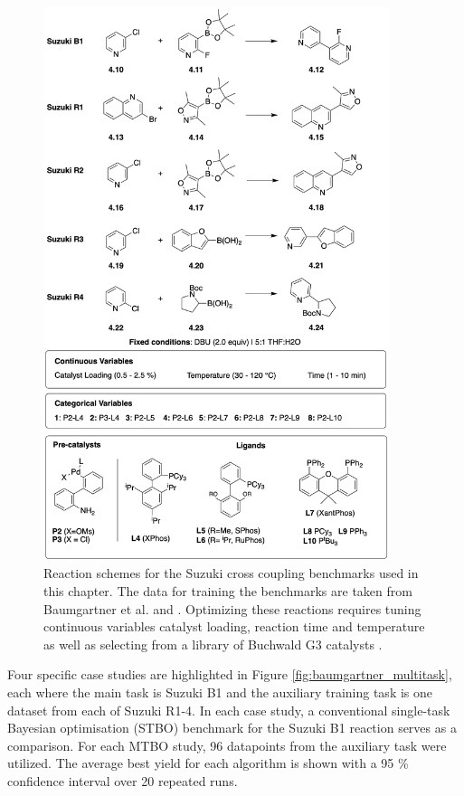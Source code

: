 \begin{figure}
    \centering
    \includegraphics[width=0.9\textwidth]{gfx/Chapter04/suzuki_benchmarks_thesis.png}
    \caption{Reaction schemes for the Suzuki cross coupling benchmarks used in this chapter. The data for training the benchmarks are taken from Baumgartner et al. \cite{Baumgartner2018} and \cite{Reizman2016b}. Optimizing these reactions requires tuning continuous variables catalyst loading, reaction time and temperature as well as selecting from a library of Buchwald G3 catalysts \cite{Bruno2013}.}
    \label{fig:benchmarks_suzuki}
\end{figure}

Four specific case studies are highlighted in Figure \ref{fig:baumgartner_multitask}, each where the main task is Suzuki B1 and the auxiliary training task is one dataset from each of Suzuki R1-4. In each case study, a conventional single-task Bayesian optimisation (STBO) benchmark for the Suzuki B1 reaction serves as a comparison.   For each MTBO study, 96 datapoints from the auxiliary task were utilized. The average best yield for each algorithm is shown with a 95 \% confidence interval over 20 repeated runs. 

